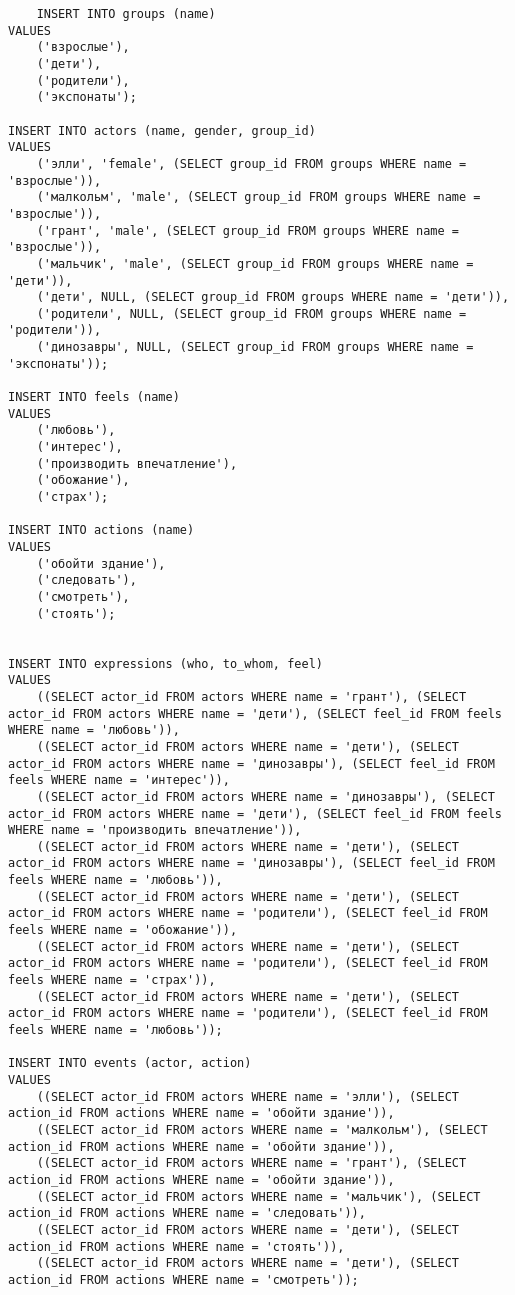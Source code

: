 
\begin{verbatim}
    INSERT INTO groups (name)
VALUES
    ('взрослые'),
    ('дети'),
    ('родители'),
    ('экспонаты');

INSERT INTO actors (name, gender, group_id)
VALUES
    ('элли', 'female', (SELECT group_id FROM groups WHERE name = 'взрослые')),
    ('малкольм', 'male', (SELECT group_id FROM groups WHERE name = 'взрослые')),
    ('грант', 'male', (SELECT group_id FROM groups WHERE name = 'взрослые')),
    ('мальчик', 'male', (SELECT group_id FROM groups WHERE name = 'дети')),
    ('дети', NULL, (SELECT group_id FROM groups WHERE name = 'дети')),
    ('родители', NULL, (SELECT group_id FROM groups WHERE name = 'родители')),
    ('динозавры', NULL, (SELECT group_id FROM groups WHERE name = 'экспонаты'));

INSERT INTO feels (name)
VALUES
    ('любовь'),
    ('интерес'),
    ('производить впечатление'),
    ('обожание'),
    ('страх');

INSERT INTO actions (name)
VALUES
    ('обойти здание'),
    ('следовать'),
    ('смотреть'),
    ('стоять');


INSERT INTO expressions (who, to_whom, feel)
VALUES
    ((SELECT actor_id FROM actors WHERE name = 'грант'), (SELECT actor_id FROM actors WHERE name = 'дети'), (SELECT feel_id FROM feels WHERE name = 'любовь')),
    ((SELECT actor_id FROM actors WHERE name = 'дети'), (SELECT actor_id FROM actors WHERE name = 'динозавры'), (SELECT feel_id FROM feels WHERE name = 'интерес')),
    ((SELECT actor_id FROM actors WHERE name = 'динозавры'), (SELECT actor_id FROM actors WHERE name = 'дети'), (SELECT feel_id FROM feels WHERE name = 'производить впечатление')),
    ((SELECT actor_id FROM actors WHERE name = 'дети'), (SELECT actor_id FROM actors WHERE name = 'динозавры'), (SELECT feel_id FROM feels WHERE name = 'любовь')),
    ((SELECT actor_id FROM actors WHERE name = 'дети'), (SELECT actor_id FROM actors WHERE name = 'родители'), (SELECT feel_id FROM feels WHERE name = 'обожание')),
    ((SELECT actor_id FROM actors WHERE name = 'дети'), (SELECT actor_id FROM actors WHERE name = 'родители'), (SELECT feel_id FROM feels WHERE name = 'страх')),
    ((SELECT actor_id FROM actors WHERE name = 'дети'), (SELECT actor_id FROM actors WHERE name = 'родители'), (SELECT feel_id FROM feels WHERE name = 'любовь'));

INSERT INTO events (actor, action)
VALUES
    ((SELECT actor_id FROM actors WHERE name = 'элли'), (SELECT action_id FROM actions WHERE name = 'обойти здание')),
    ((SELECT actor_id FROM actors WHERE name = 'малкольм'), (SELECT action_id FROM actions WHERE name = 'обойти здание')),
    ((SELECT actor_id FROM actors WHERE name = 'грант'), (SELECT action_id FROM actions WHERE name = 'обойти здание')),
    ((SELECT actor_id FROM actors WHERE name = 'мальчик'), (SELECT action_id FROM actions WHERE name = 'следовать')),
    ((SELECT actor_id FROM actors WHERE name = 'дети'), (SELECT action_id FROM actions WHERE name = 'стоять')),
    ((SELECT actor_id FROM actors WHERE name = 'дети'), (SELECT action_id FROM actions WHERE name = 'смотреть'));
\end{verbatim}